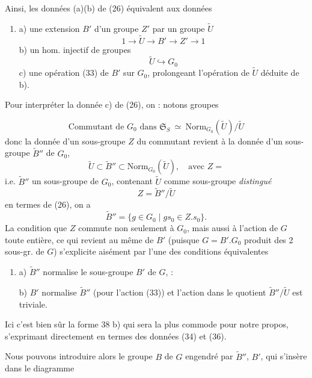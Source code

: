 \documentclass[11pt,a4paper]{article}
\begin{document}
Ainsi, les données (a)(b) de (26) équivalent aux données
\begin{enumerate}
\item[(34)] a) une extension $B'$ d'un groupe $Z'$ par un groupe $\tilde{U}$
\[
1\to\tilde{U}\to B'\to Z'\to 1
\]
b) un hom. injectif de groupes
\[
\tilde{U}\hookrightarrow G_0
\]
c) une opération (33) de $B'$ sur $G_0$, prolongeant l'opération de $\tilde{U}$ déduite de b).
\end{enumerate}

Pour interpréter la donnée c) de (26), on  : notons   groupes

\[
\text{Commutant de } G_0 \text{ dans } \mathfrak{S}_S \ \simeq\ \mathrm{Norm}_{G_0}(\tilde{U})/\tilde{U} \tag{35}
\]
donc la donnée d'un sous-groupe $Z$ du commutant revient à la donnée d'un sous-groupe $\tilde{B}''$ de $G_0$, 
\[
\tilde{U}\subset\tilde{B}''\subset\mathrm{Norm}_{G_0}(\tilde{U}),\quad\text{avec } Z= \tag{36}
\]
i.e. $\tilde{B}''$ un sous-groupe de $G_0$, contenant $\tilde{U}$ comme sous-groupe \emph{distingué}  \ill{}  
\[
Z=\tilde{B}''/\tilde{U}
\]
en termes de (26), on a
\[
\tilde{B}''=\{g\in G_0\mid gs_0\in Z.s_0\}. \tag{37}
\]
La condition que $Z$ commute non seulement à $G_0$, mais aussi à l'action de $G$ toute entière, ce qui revient au même de $B'$ (puisque $G=B'.G_0$ produit des 2 sous-gr. de $G$) s'explicite aisément par l'une des conditions équivalentes
\begin{enumerate}
\item[(38)] a) $\tilde{B}''$ normalise le sous-groupe $B'$ de $G$,  :

b) $B'$ normalise $\tilde{B}''$ (pour l'action (33)) et l'action dans le quotient $\tilde{B}''/\tilde{U}$ est triviale.
\end{enumerate}
Ici c'est bien sûr la forme 38 b) qui sera la plus commode pour notre propos,  s'exprimant directement en termes des données (34) et (36).

Nous pouvons introduire alors le groupe $B$ de $G$ engendré par $\tilde{B}''$, $B'$, qui s'insère dans le diagramme

\end{document}
